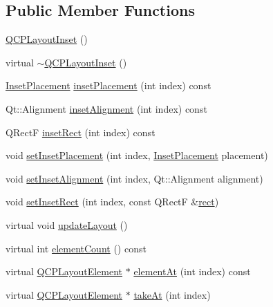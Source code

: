 \subsection*{Public Member Functions}
\begin{DoxyCompactItemize}
\item 
\hyperlink{class_q_c_p_layout_inset_a3ad984f3221735374cc5dee14356a7dd}{Q\-C\-P\-Layout\-Inset} ()
\item 
virtual \hyperlink{class_q_c_p_layout_inset_a7d0e5647b2e92df92abab532441db112}{$\sim$\-Q\-C\-P\-Layout\-Inset} ()
\item 
\hyperlink{class_q_c_p_layout_inset_a8b9e17d9a2768293d2a7d72f5e298192}{Inset\-Placement} \hyperlink{class_q_c_p_layout_inset_a8472ff2508807513e4cb0ce0c1d652b3}{inset\-Placement} (int index) const 
\item 
Qt\-::\-Alignment \hyperlink{class_q_c_p_layout_inset_a78c0c494bb5728237cebb63ae8ef5c58}{inset\-Alignment} (int index) const 
\item 
Q\-Rect\-F \hyperlink{class_q_c_p_layout_inset_a5ec7037b3b8d20fbf9560e01779b1442}{inset\-Rect} (int index) const 
\item 
void \hyperlink{class_q_c_p_layout_inset_a63298830744d5d8c5345511c00fd2144}{set\-Inset\-Placement} (int index, \hyperlink{class_q_c_p_layout_inset_a8b9e17d9a2768293d2a7d72f5e298192}{Inset\-Placement} placement)
\item 
void \hyperlink{class_q_c_p_layout_inset_a62882a4f9ad58bb0f53da12fde022abe}{set\-Inset\-Alignment} (int index, Qt\-::\-Alignment alignment)
\item 
void \hyperlink{class_q_c_p_layout_inset_aa487c8378a6f9533567a2e6430099dc3}{set\-Inset\-Rect} (int index, const Q\-Rect\-F \&\hyperlink{class_q_c_p_layout_element_affdfea003469aac3d0fac5f4e06171bc}{rect})
\item 
virtual void \hyperlink{class_q_c_p_layout_inset_a7b33fdd51b18e6db7cea9bfb2d263b4a}{update\-Layout} ()
\item 
virtual int \hyperlink{class_q_c_p_layout_inset_a2087b97b9266fd9e0f571a8d3cf709f9}{element\-Count} () const 
\item 
virtual \hyperlink{class_q_c_p_layout_element}{Q\-C\-P\-Layout\-Element} $\ast$ \hyperlink{class_q_c_p_layout_inset_ab096d07b08f9b5455647f3ba7ff60e27}{element\-At} (int index) const 
\item 
virtual \hyperlink{class_q_c_p_layout_element}{Q\-C\-P\-Layout\-Element} $\ast$ \hyperlink{class_q_c_p_layout_inset_ad6756a3b507e20496aaf7f5ca16c47d1}{take\-At} (int index)

\end{DoxyCompactItemize}
